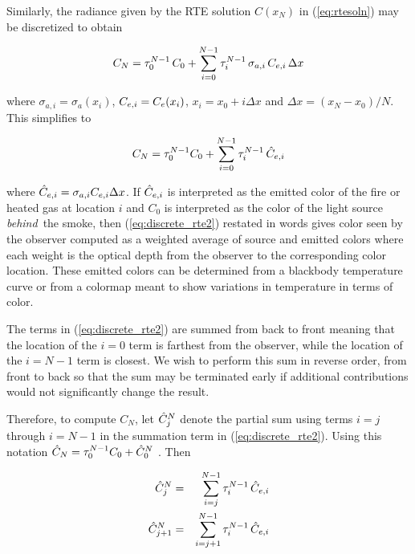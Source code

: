 Similarly, the radiance given by the RTE solution $C(x_N)$ in
(\ref{eq:rtesoln}) may be discretized to obtain

\begin{eqnarray}
C_{N} = \tau_{0}^{N-1}\,C_0 +
\sum_{i=0}^{N-1}\tau_{i}^{N-1}\,\sigma_{a,i}\,C_{e,i}\,\Delta x
\end{eqnarray}

\noindent where $\sigma_{a,i}=\sigma_a(x_i)$, $C_{e,i}=C_e(x_i)$,
$x_i=x_0+i\Delta x$ and $\Delta x=(x_N-x_0)/N$. This simplifies to

\begin{equation}
\label{eq:discrete_rte2}
C_N = \tau_{0}^{N-1}C_0 + \sum_{i=0}^{N-1}\tau_{i}^{N-1}\,\hat{C}_{e,i}
\end{equation}

\noindent where $\hat{C}_{e,i}=\sigma_{a,i}C_{e,i}\Delta x$.  If
$\hat{C}_{e,i}$ is interpreted as the emitted color of the fire or
heated gas at location $i$ and $C_0$ is interpreted as the color
of the light source {\em behind}\ the smoke, then
(\ref{eq:discrete_rte2}) restated in words gives color seen by the
observer computed as a weighted average of source and emitted
colors where each weight is the optical depth from the observer to
the corresponding color location.  These emitted colors can be
determined from a blackbody temperature curve or from a colormap
meant to show variations in temperature in terms of color.


The terms in (\ref{eq:discrete_rte2}) are summed from back to
front meaning that the location of the $i=0$ term is farthest from
the observer, while the location of the $i=N-1$ term is closest.
We wish to perform this sum in reverse order, from front to back
so that the sum may be terminated early if additional
contributions would not significantly change the result.

Therefore, to compute $C_N$, let $\hat{C}_{j}^N$ denote the partial
sum using terms $i=j$ through $i=N-1$ in the summation term in
(\ref{eq:discrete_rte2}).  Using this notation
$\hat{C}_N=\tau_{0}^{N-1}C_0+\hat{C}_{0}^N$ . Then

\begin{eqnarray}
\label{eq:recurse1}
\hat{C}_{j}^N &= &\sum_{i=j}^{N-1}\tau_{i}^{N-1}\,\hat{C}_{e,i}\\
\label{eq:recurse2}
\hat{C}_{j+1}^N     &= &\sum_{i=j+1}^{N-1}  \tau_{i}^{N-1}\,\hat{C}_{e,i}
\end{eqnarray}


